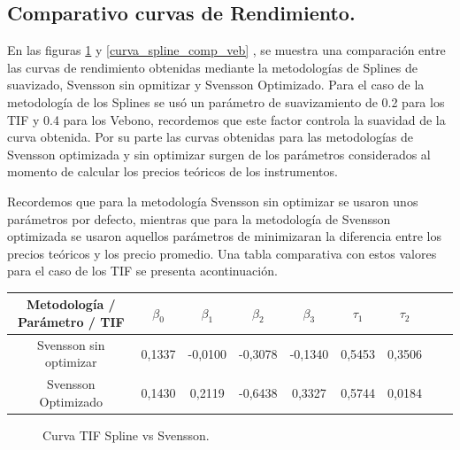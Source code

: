 \newpage

\subsection{Comparativo curvas de Rendimiento.}\hspace{5cm}

\hspace{0.4cm} En las figuras \ref{curva_spline_comp_tif} y \ref{curva_spline_comp_veb} , se muestra una comparaci\'on entre las curvas de rendimiento obtenidas mediante la metodolog\'ias de Splines de suavizado, Svensson sin opmitizar y Svensson Optimizado.
Para el caso de la metodolog\'ia de los Splines se us\'o un par\'ametro de suavizamiento de 0.2 para los TIF y 0.4 para los Vebono, recordemos que este factor controla la suavidad de la curva obtenida. Por su parte las curvas obtenidas para las metodolog\'ias de Svensson optimizada y sin optimizar surgen de los par\'ametros considerados al momento de calcular los precios te\'oricos de los instrumentos.

\hspace{0.4cm}Recordemos que para la metodolog\'ia Svensson sin optimizar se usaron unos par\'ametros por defecto, mientras que para la metodolog\'ia de Svensson optimizada se usaron aquellos par\'ametros de minimizaran la diferencia entre los precios te\'oricos y los precio promedio. Una tabla comparativa  con estos valores para el caso de los TIF se presenta acontinuaci\'on.

\begin{center}
{\begin{tabular}[t]{|c |c |c |c |c |c |c |c |r|}
\hline
Metodolog\'ia / Par\'ametro / TIF & $\beta_{0}$ & $\beta_{1}$ & $\beta_{2}$ & $\beta_{3}$  &  $\tau_{1}$ & $\tau_{2}$ \\
\hline
Svensson sin optimizar & 0,1337 & -0,0100 & -0,3078 & -0,1340  & 0,5453 & 0,3506\\
\hline
Svensson Optimizado & 0,1430 & 0,2119 & -0,6438 & 0,3327 & 0,5744 & 0,0184 \\
\hline
\end{tabular}}
\end{center}


\newpage

\begin{figure}[h]
\caption{Curva TIF Spline vs Svensson.}
\label{curva_spline_comp_tif}
\end{figure}

